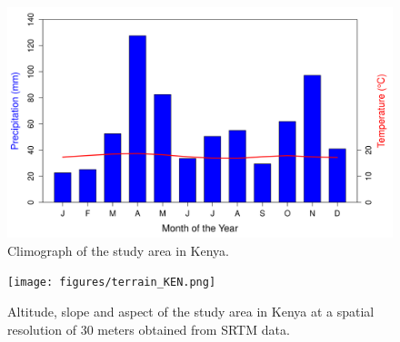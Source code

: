 \documentclass[12pt,a4paper, twoside, english]{article}
\begin{document}
\begin{figure}[H]
  \centering
  \includegraphics[width=\textwidth]{figures/Climograph_KEN.png}
  \caption[Climograph of Laikipia]{Climograph of the study area in Kenya.}
  \label{fig:climograph_ken}
\end{figure}




\begin{figure}[H]
  \centering
  \texttt{[image: figures/terrain\_KEN.png]}
  \caption[Terrain of Laikipia]{Altitude, slope and aspect of the study area in Kenya at a spatial resolution of 30 meters obtained from SRTM data.}
  \label{fig:terrain_ken}
\end{figure}
\end{document}
